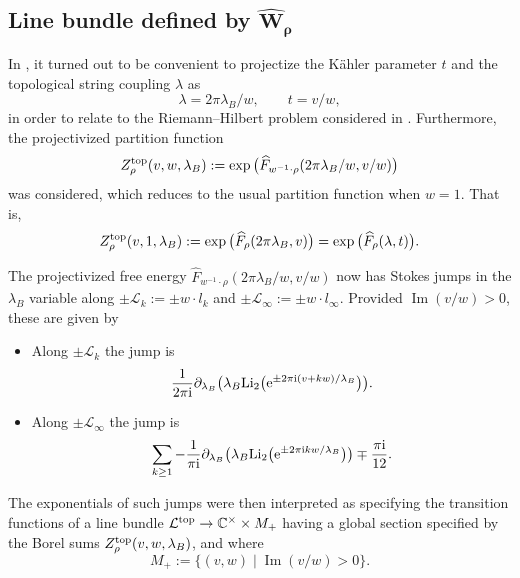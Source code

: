 \documentclass[pdftex]{sigma}
\numberwithin{equation}{section}
\begin{document}
\subsection[Line bundle defined by $\hat{W}_{\rho}$]{Line bundle defined by $\boldsymbol{\hat{W}_{\rho}}$}

In \cite{ASTT21}, it turned out to be convenient to projectize the K\"ahler parameter $t$ and the topological string coupling $\lambda$ as
\begin{equation*}
 \lambda = 2\pi \lambda_B/w, \qquad t=v/w,
\end{equation*}
in order to relate to the Riemann--Hilbert problem considered in \cite{Bridgeland1,BridgelandCon}. Furthermore, the projectivized partition function
\begin{equation*}
 Z^{{\rm top}}_{\rho}(v,w,\lambda_B):=\exp\big(\widehat{F}_{w^{-1}\cdot \rho}(2\pi\lambda_B/w, v/w)\big)
\end{equation*}
was considered, which reduces to the usual partition function when $w=1$. That is,
\begin{equation*}
 Z^{{\rm top}}_{\rho}(v,1,\lambda_B):=\exp\big(\widehat{F}_{\rho}(2\pi\lambda_B, v)\big)=\exp\big(\widehat{F}_{\rho}(\lambda, t)\big).
\end{equation*}

The projectivized free energy $\widehat{F}_{w^{-1}\cdot \rho}(2\pi\lambda_B/w, v/w)$ now has Stokes jumps in the $\lambda_B$ variable along $\pm \mathcal{L}_k:= \pm w\cdot l_k$ and $\pm \mathcal{L}_{\infty}:= \pm w\cdot l_{\infty}$. Provided $\operatorname{Im}(v/w)>0$, these are given by
\begin{itemize}\itemsep=0pt
\item Along $\pm \mathcal{L}_k$ the jump is
 \begin{equation*}
 \frac{1}{2\pi \mathrm{i}}\partial_{\lambda_B}\big(\lambda_B\mathrm{Li}_2\big({\rm e}^{\pm 2\pi \mathrm{i}(v+kw)/\lambda_B}\big)\big).
 \end{equation*}
 \item Along $\pm \mathcal{L}_{\infty}$ the jump is
 \begin{equation*}
 \sum_{k\geq 1}-\frac{1}{\pi \mathrm{i}}\partial_{\lambda_B}\big(\lambda_B\mathrm{Li}_2\big({\rm e}^{\pm 2\pi {\rm i}kw/\lambda_B}\big)\big)\mp \frac{\pi \mathrm{i}}{12}.
 \end{equation*}
\end{itemize}

The exponentials of such jumps were then interpreted as specifying the transition functions of a line bundle $\mathcal{L}^{{\rm top}}\to \mathbb{C}^{\times}\times M_{+}$ having a global section specified by the Borel sums $Z_{\rho}^{{\rm top}}(v,w,\lambda_B)$, and where
\begin{equation*}
 M_{+}:=\{(v,w) \mid \operatorname{Im}(v/w)>0\}.
\end{equation*}
\end{document}
